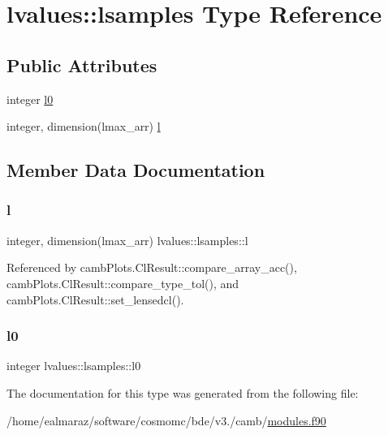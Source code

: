 \hypertarget{structlvalues_1_1lsamples}{}\section{lvalues\+:\+:lsamples Type Reference}
\label{structlvalues_1_1lsamples}
\subsection*{Public Attributes}
\begin{DoxyCompactItemize}
\item 
integer \mbox{\hyperlink{structlvalues_1_1lsamples_a3d63735c093845c1132a983edb5f939f}{l0}}
\item 
integer, dimension(lmax\+\_\+arr) \mbox{\hyperlink{structlvalues_1_1lsamples_a80f43df6f454640c8a340298d9405ca8}{l}}
\end{DoxyCompactItemize}


\subsection{Member Data Documentation}
\mbox{\label{structlvalues_1_1lsamples_a80f43df6f454640c8a340298d9405ca8}} 
\subsubsection{\texorpdfstring{l}{l}}
{\footnotesize\ttfamily integer, dimension(lmax\+\_\+arr) lvalues\+::lsamples\+::l}



Referenced by camb\+Plots.\+Cl\+Result\+::compare\+\_\+array\+\_\+acc(), camb\+Plots.\+Cl\+Result\+::compare\+\_\+type\+\_\+tol(), and camb\+Plots.\+Cl\+Result\+::set\+\_\+lensedcl().

\mbox{\label{structlvalues_1_1lsamples_a3d63735c093845c1132a983edb5f939f}} 
\subsubsection{\texorpdfstring{l0}{l0}}
{\footnotesize\ttfamily integer lvalues\+::lsamples\+::l0}



The documentation for this type was generated from the following file\+:\begin{DoxyCompactItemize}
\item 
/home/ealmaraz/software/cosmomc/bde/v3./camb/\mbox{\hyperlink{modules_8f90}{modules.\+f90}}\end{DoxyCompactItemize}
